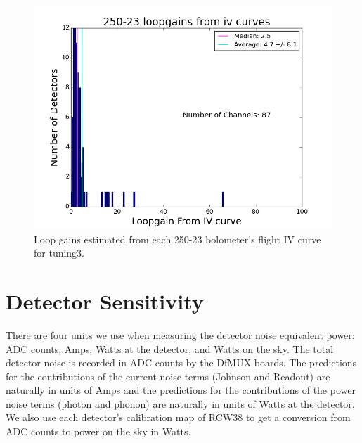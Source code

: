 \begin{figure}[htbp]
\begin{center}
\includegraphics[width=0.5 \textwidth]{figures/250-23_loopgains_from_iv_tuning3.png}
\caption{Loop gains estimated from each 250-23 bolometer's flight IV curve for tuning3.}
\label{fig:loopgain_from_iv_hist}
\end{center}
\end{figure}





\section{Detector Sensitivity}
\label{sensitivity}

There are four units we use when measuring the detector noise equivalent power: ADC counts, Amps, Watts at the detector, and Watts on the sky. The total detector noise is recorded in ADC counts by the DfMUX boards. The predictions for the contributions of the current noise terms (Johnson and Readout) are naturally in units of Amps and the predictions for the contributions of the power noise terms (photon and phonon) are naturally in units of Watts at the detector. We also use each detector's calibration map of RCW38 to get a conversion from ADC counts to power on the sky in Watts.

